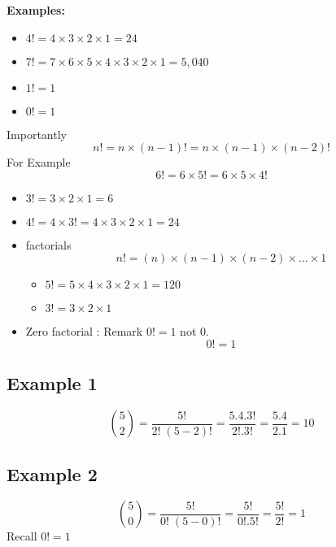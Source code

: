 \documentclass[]{report}
\begin{document}
\noindent \textbf{Examples:}

\begin{itemize}
	\item $4! = 4 \times 3 \times 2 \times 1 = 24$
	\item $7! = 7 \times 6 \times 5 \times 4 \times 3 \times 2 \times 1 = 5,040$
	\item $1! = 1$
	\item $0! = 1 $
\end{itemize}
Importantly 
\[n! = n \times (n-1)!  = n \times (n-1) \times (n-2)! \]
For Example
\[6! = 6 \times 5!  = 6 \times 5 \times 4! \]



\begin{itemize}
	\item $3!  = 3 \times 2  \times 1 = 6 $
	
	\item $4!  = 4 \times 3! = 4 \times 3 \times 2 \times 1 = 24$
	
	\item factorials 
	\[ n! = (n)\times (n-1)\times(n-2) \times \ldots \times 1 \]
	\begin{itemize}
		\item $5! = 5 \times 4 \times 3 \times 2 \times 1 = 120 $
		\item $3! = 3 \times 2 \times 1$
	\end{itemize}
	\item Zero factorial : Remark $0! = 1$ not $0$.
	\[ 0! =  1 \]
\end{itemize}	

\subsection{Example 1}

\[ \binom 5 2  = \frac{5!}{2!\;(5-2)!} = \frac{5.4.3!}{2! .3!} = \frac{5.4}{2.1} = 10\]

\subsection*{Example 2}

\[ \binom 5 0   = \frac{5!}{0!\;(5-0)!} = \frac{5!}{0! .5!} = \frac{5!}{2!} = 1\]
Recall $0! =1$
\end{document}
